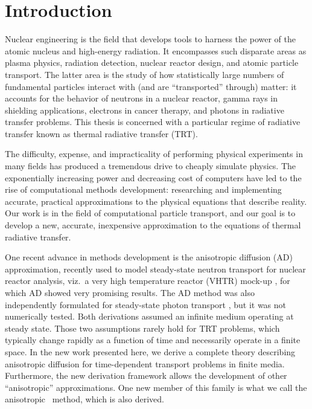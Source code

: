 
\chapter{Introduction}\label{chap:introduction}

Nuclear engineering is the field that develops tools to harness the power of the
atomic nucleus and high-energy radiation. It encompasses such
disparate areas as plasma physics, radiation detection, nuclear reactor design,
and atomic particle transport. The latter area is the study of how
statistically large numbers of fundamental particles interact with (and are
``transported'' through) matter: it
accounts for the behavior of neutrons in a nuclear reactor,
gamma rays in shielding applications, electrons in cancer therapy, and photons
in radiative transfer problems. This thesis is concerned with a
particular regime of radiative transfer known as thermal radiative transfer
(TRT).

The difficulty, expense, and impracticality of performing physical
experiments in many fields has produced a tremendous drive to cheaply
simulate physics. The exponentially increasing power and decreasing cost of
computers have led to the rise of computational methods development:
researching and implementing accurate, practical approximations to the physical
equations that describe reality. Our work is in the field of computational
particle transport, and our goal is to develop a new, accurate, inexpensive
approximation to the equations of thermal radiative transfer.

One recent advance in methods development is the anisotropic diffusion (AD)
approximation, recently used to model steady-state neutron transport for
nuclear reactor analysis, viz.~a very high temperature reactor
(VHTR) mock-up \cite{Lar2009c,Tra2011}, for which AD showed very promising
results. The AD
method was also independently formulated for steady-state photon transport
\cite{Mor2007}, but it was not numerically tested.
Both derivations assumed an infinite medium operating at steady state.
Those two assumptions rarely hold for TRT problems, which typically change
rapidly as a
function of time and necessarily operate in a finite space. In the new
work presented here, we derive a complete theory describing anisotropic
diffusion for time-dependent transport problems in finite media. Furthermore,
the new derivation framework allows the development of other ``anisotropic''
approximations. One new member of this family is what we call the anisotropic
\Pone\ method, which is also derived.

